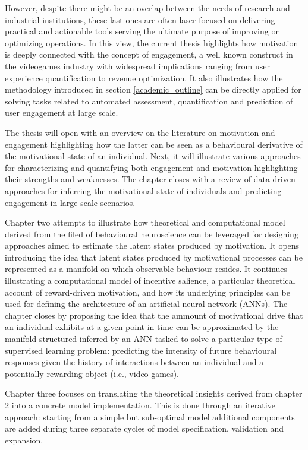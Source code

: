 However, despite there might be an overlap between the needs of research and industrial institutions, these last ones are often laser-focused on delivering practical and actionable tools serving the ultimate purpose of improving or optimizing operations. In this view, the current thesis highlights how motivation is deeply connected with the concept of engagement, a well known construct in the videogames industry with widespread implications ranging from user experience quantification to revenue optimization. It also illustrates how the methodology introduced in section \ref{academic_outline} can be directly applied for solving tasks related to automated assessment, quantification and prediction of user engagement at large scale.

The thesis will open with an overview on the literature on motivation and engagement highlighting how the latter can be seen as a behavioural derivative of the motivational state of an individual. Next, it will illustrate various approaches for characterizing and quantifying both engagement and motivation highlighting their strengths and weaknesses. The chapter closes with a review of data-driven approaches for inferring the motivational state of individuals and predicting engagement in large scale scenarios. 

Chapter two attempts to illustrate how theoretical and computational model derived from the filed of behavioural neuroscience can be leveraged for designing approaches aimed to estimate the latent states produced by motivation. It opens introducing the idea that latent states produced by motivational processes can be represented as a manifold on which observable behaviour resides. It continues illustrating a computational model of incentive salience, a particular theoretical account of reward-driven motivation, and how its underlying principles can be used for defining the architecture of an artificial neural network (ANNs). The chapter closes by proposing the idea that the ammount of motivational drive that an individual exhibits at a given point in time can be approximated by the manifold structured inferred by an ANN tasked to solve a particular type of supervised learning problem: predicting the intensity of future behavioural responses given the history of interactions between an individual and a potentially rewarding object (i.e., video-games). 

Chapter three focuses on translating the theoretical insights derived from chapter 2 into a concrete model implementation. This is done through an iterative approach: starting from a simple but sub-optimal model additional components are added during three separate cycles of model specification, validation and expansion. 

